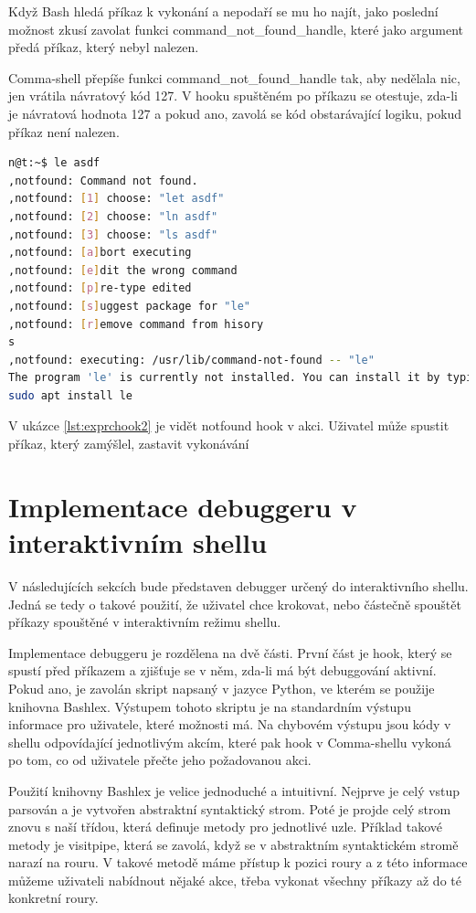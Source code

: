\documentclass[thesis=M,czech]{FITthesis}[2012/06/26]
\begin{document}
Když Bash hledá příkaz k vykonání a nepodaří se mu ho najít, jako poslední možnost zkusí zavolat funkci command\_not\_found\_handle, které jako argument předá příkaz, který nebyl nalezen.

Comma-shell přepíše funkci command\_not\_found\_handle tak, aby nedělala nic, jen vrátila návratový kód 127. V hooku spuštěném po příkazu se otestuje, zda-li je návratová hodnota 127 a pokud ano, zavolá se kód obstarávající logiku, pokud příkaz není nalezen.

\begin{minipage}{\linewidth}
\begin{lstlisting}[language=bash, caption={Explain RC hook}, label={lst:exprchook2}]
n@t:~$ le asdf
,notfound: Command not found.
,notfound: [1] choose: "let asdf"
,notfound: [2] choose: "ln asdf"
,notfound: [3] choose: "ls asdf"
,notfound: [a]bort executing
,notfound: [e]dit the wrong command
,notfound: [p]re-type edited
,notfound: [s]uggest package for "le"
,notfound: [r]emove command from hisory
s
,notfound: executing: /usr/lib/command-not-found -- "le"
The program 'le' is currently not installed. You can install it by typing:
sudo apt install le
\end{lstlisting}
\end{minipage}

V ukázce \ref{lst:exprchook2} je vidět notfound hook v akci. Uživatel může spustit příkaz, který zamýšlel, zastavit vykonávání

%
%
%
%
%
\section{Implementace debuggeru v interaktivním shellu}

V následujících sekcích bude představen debugger určený do interaktivního shellu. Jedná se tedy o takové použití, že uživatel chce krokovat, nebo částečně spouštět příkazy spouštěné v interaktivním režimu shellu.

Implementace debuggeru je rozdělena na dvě části. První část je hook, který se spustí před příkazem a zjišťuje se v něm, zda-li má být debuggování aktivní. Pokud ano, je zavolán skript napsaný v jazyce Python, ve kterém se použije knihovna Bashlex. Výstupem tohoto skriptu je na standardním výstupu informace pro uživatele, které možnosti má. Na chybovém výstupu jsou kódy v shellu odpovídající jednotlivým akcím, které pak hook v Comma-shellu vykoná po tom, co od uživatele přečte jeho požadovanou akci.

Použití knihovny Bashlex je velice jednoduché a intuitivní. Nejprve je celý vstup parsován a je vytvořen abstraktní syntaktický strom. Poté je projde celý strom znovu s naší třídou, která definuje metody pro jednotlivé uzle. Příklad takové metody je visitpipe, která se zavolá, když se v abstraktním syntaktickém stromě narazí na rouru. V takové metodě máme přístup k pozici roury a z této informace můžeme uživateli nabídnout nějaké akce, třeba vykonat všechny příkazy až do té konkretní roury.
\end{document}
